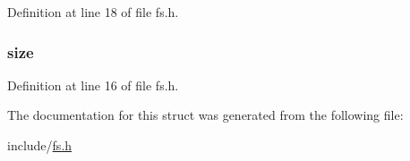 Definition at line 18 of file fs.\-h.

\hypertarget{structsuperblock_a22d26304a3b3aca97e6311f6939dd1bf}{
\subsubsection[{size}]{ size}}\label{structsuperblock_a22d26304a3b3aca97e6311f6939dd1bf}


Definition at line 16 of file fs.\-h.



The documentation for this struct was generated from the following file\-:\begin{DoxyCompactItemize}
\item 
include/\hyperlink{fs_8h}{fs.\-h}\end{DoxyCompactItemize}
